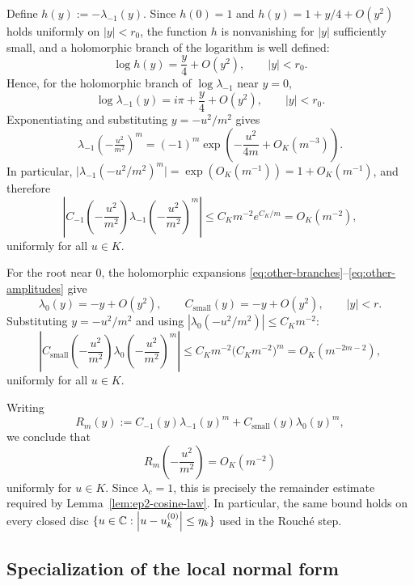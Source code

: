 Define \(h(y):=-\lambda_{-1}(y)\).
Since \(h(0)=1\) and \(h(y)=1+y/4+O(y^2)\) holds uniformly on \(|y|<r_0\), the function \(h\) is nonvanishing for \(|y|\) sufficiently small, and a holomorphic branch of the logarithm is well defined:
\[
\log h(y)=\frac{y}{4}+O(y^2),
\qquad |y|<r_0.
\]
Hence, for the holomorphic branch of \(\log\lambda_{-1}\) near \(y=0\),
\begin{equation}\label{eq:log-lambda-minus-one}
\log \lambda_{-1}(y)=i\pi+\frac{y}{4}+O(y^2),
\qquad |y|<r_0.
\end{equation}
Exponentiating and substituting \(y=-u^2/m^2\) gives
\[
\lambda_{-1}\!\left(-\tfrac{u^2}{m^2}\right)^m
=
(-1)^m\exp\!\left(-\frac{u^2}{4m}+O_K(m^{-3})\right).
\]
In particular, \(\bigl|\lambda_{-1}(-u^2/m^2)^m\bigr|=\exp(O_K(m^{-1}))=1+O_K(m^{-1})\), and therefore
\[
\left|
C_{-1}\!\left(-\frac{u^2}{m^2}\right)
\lambda_{-1}\!\left(-\frac{u^2}{m^2}\right)^m
\right|
\le C_K m^{-2}e^{C_K/m}
=
O_K(m^{-2}),
\]
uniformly for all $u\in K$.

For the root near \(0\), the holomorphic expansions \eqref{eq:other-branches}--\eqref{eq:other-amplitudes} give
\[
\lambda_0(y)=-y+O(y^2),
\qquad
C_{\mathrm{small}}(y)=-y+O(y^2),
\qquad |y|<r.
\]
Substituting \(y=-u^2/m^2\) and using $|\lambda_0(-u^2/m^2)|\le C_K m^{-2}$:
\[
\left|
C_{\mathrm{small}}\!\left(-\frac{u^2}{m^2}\right)
\lambda_0\!\left(-\frac{u^2}{m^2}\right)^m
\right|
\le
C_K m^{-2}\bigl(C_K m^{-2}\bigr)^m
=
O_K(m^{-2m-2}),
\]
uniformly for all $u\in K$.

Writing
\[
R_m(y):=
C_{-1}(y)\lambda_{-1}(y)^m+C_{\mathrm{small}}(y)\lambda_0(y)^m,
\]
we conclude that
\[
R_m\!\left(-\frac{u^2}{m^2}\right)=O_K(m^{-2})
\]
uniformly for \(u\in K\).
Since \(\lambda_c=1\), this is precisely the remainder estimate required by Lemma~\ref{lem:ep2-cosine-law}.
In particular, the same bound holds on every closed disc \(\{u\in\mathbb{C}:\left\lvert u-u_k^{(0)}\right\rvert\le \eta_k\}\) used in the Rouch\'e step.

\subsection{Specialization of the local normal form}

